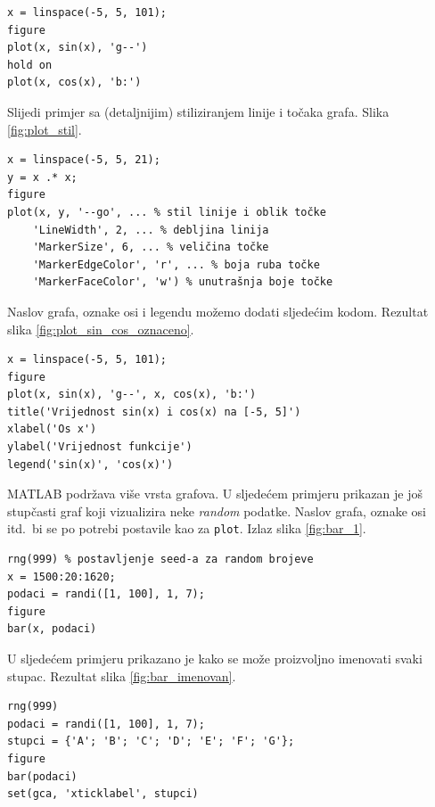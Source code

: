 \documentclass[a4paper, 10pt]{article}
\begin{document}
\begin{lstlisting}
x = linspace(-5, 5, 101);
figure
plot(x, sin(x), 'g--')
hold on
plot(x, cos(x), 'b:')
\end{lstlisting}

Slijedi primjer sa (detaljnijim) stiliziranjem linije i točaka grafa. Slika \ref{fig:plot_stil}.

\begin{lstlisting}
x = linspace(-5, 5, 21);
y = x .* x;
figure
plot(x, y, '--go', ... % stil linije i oblik točke
    'LineWidth', 2, ... % debljina linija
    'MarkerSize', 6, ... % veličina točke
    'MarkerEdgeColor', 'r', ... % boja ruba točke
    'MarkerFaceColor', 'w') % unutrašnja boje točke
\end{lstlisting}

Naslov grafa, oznake osi i legendu možemo dodati sljedećim kodom. Rezultat slika \ref{fig:plot_sin_cos_oznaceno}.

\begin{lstlisting}
x = linspace(-5, 5, 101);
figure
plot(x, sin(x), 'g--', x, cos(x), 'b:')
title('Vrijednost sin(x) i cos(x) na [-5, 5]')
xlabel('Os x')
ylabel('Vrijednost funkcije')
legend('sin(x)', 'cos(x)')
\end{lstlisting}

MATLAB podržava više vrsta grafova. U sljedećem primjeru prikazan je još stupčasti graf koji vizualizira neke \emph{random} podatke. Naslov grafa, oznake osi itd.\ bi se po potrebi postavile kao za \texttt{plot}. Izlaz slika \ref{fig:bar_1}.

\begin{lstlisting}
rng(999) % postavljenje seed-a za random brojeve
x = 1500:20:1620;
podaci = randi([1, 100], 1, 7);
figure
bar(x, podaci)
\end{lstlisting}

U sljedećem primjeru prikazano je kako se može proizvoljno imenovati svaki stupac. Rezultat slika \ref{fig:bar_imenovan}.

\begin{lstlisting}
rng(999)
podaci = randi([1, 100], 1, 7);
stupci = {'A'; 'B'; 'C'; 'D'; 'E'; 'F'; 'G'};
figure
bar(podaci)
set(gca, 'xticklabel', stupci)
\end{lstlisting}

\clearpage

\end{document}
